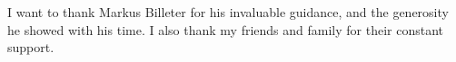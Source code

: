 I want to thank Markus Billeter for his invaluable guidance, and the generosity he showed with his time. I also thank my friends and family for their constant support.